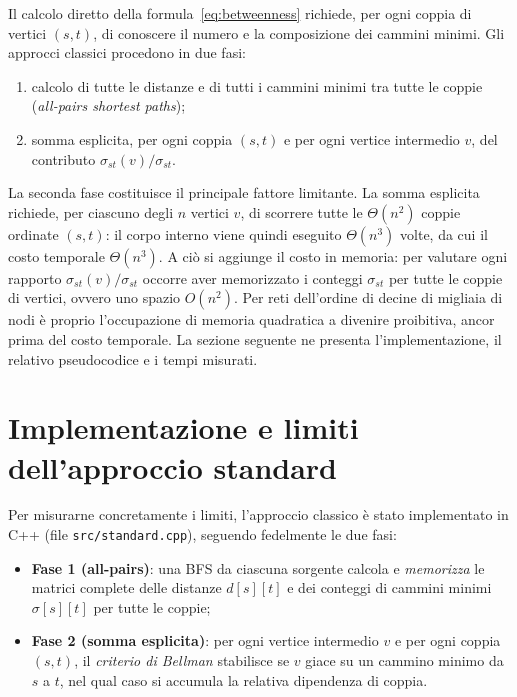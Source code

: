 \documentclass[11pt,a4paper]{report}
\begin{document}
Il calcolo diretto della formula~\eqref{eq:betweenness} richiede, per ogni coppia
di vertici $(s,t)$, di conoscere il numero e la composizione dei cammini minimi.
Gli approcci classici procedono in due fasi:
\begin{enumerate}
	\item calcolo di tutte le distanze e di tutti i cammini minimi tra tutte le
	      coppie (\emph{all-pairs shortest paths});
	\item somma esplicita, per ogni coppia $(s,t)$ e per ogni vertice intermedio
	      $v$, del contributo $\sigma_{st}(v)/\sigma_{st}$.
\end{enumerate}

La seconda fase costituisce il principale fattore limitante. La somma esplicita
richiede, per ciascuno degli $n$ vertici $v$, di scorrere tutte le $\Theta(n^2)$
coppie ordinate $(s,t)$: il corpo interno viene quindi eseguito $\Theta(n^3)$
volte, da cui il costo temporale $\Theta(n^3)$. A ciò si aggiunge il costo in
memoria: per valutare ogni rapporto $\sigma_{st}(v)/\sigma_{st}$ occorre aver
memorizzato i conteggi $\sigma_{st}$ per tutte le coppie di vertici, ovvero uno
spazio $O(n^2)$. Per reti dell'ordine di decine di migliaia di nodi è proprio
l'occupazione di memoria quadratica a divenire proibitiva, ancor prima del costo
temporale. La sezione seguente ne presenta l'implementazione, il relativo
pseudocodice e i tempi misurati.

\section{Implementazione e limiti dell'approccio standard}

Per misurarne concretamente i limiti, l'approccio classico è stato implementato in
C++ (file \texttt{src/standard.cpp}), seguendo fedelmente le due fasi:
\begin{itemize}
	\item \textbf{Fase 1 (all-pairs)}: una BFS da ciascuna sorgente
	      calcola e \emph{memorizza} le matrici complete delle distanze $d[s][t]$ e
	      dei conteggi di cammini minimi $\sigma[s][t]$ per tutte le coppie;
	\item \textbf{Fase 2 (somma esplicita)}: per ogni vertice intermedio $v$ e per
	      ogni coppia $(s,t)$, il \emph{criterio di Bellman} stabilisce se $v$ giace
	      su un cammino minimo da $s$ a $t$, nel qual caso si accumula la relativa
	      dipendenza di coppia.
\end{itemize}
\end{document}
